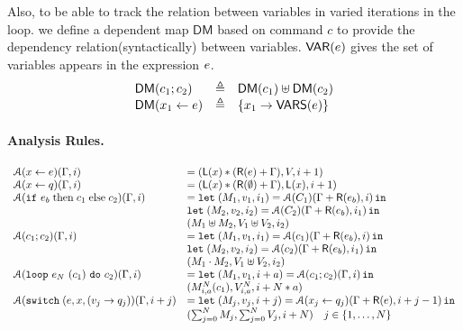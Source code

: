 \documentclass[a4paper,11pt]{article}
\begin{document}
Also, to be able to track the relation between variables in varied iterations in the loop. we define a dependent map $\mathsf{DM}$ based on command $c$ to provide the dependency relation(syntactically) between variables. $\mathsf{VAR}(e)$ gives the set of variables appears in the expression $e$.
\[
\begin{array}{lll}
\mathsf{DM} (c_1; c_2) & \triangleq &  \mathsf{DM} (c_1) \uplus \mathsf{DM} (c_2)  \\
\mathsf{DM} (x_1 \leftarrow e ) & \triangleq & \{  x_1 \to \mathsf{VARS}(e)  \}
\end{array}
\]


%
%
\paragraph{Analysis Rules.}
\[\begin{array}{ll}
    \mathcal{A}( \mathrel{ x \leftarrow e } )( \Gamma , i )  & =  ( \mathsf{L}(x) * ( \mathsf{R}(e) + \Gamma ), V, i+1 )\\
    \mathcal{A}( \mathrel{ x \leftarrow q })( \Gamma ,  i )  & = ( \mathsf{L}(x) * ( \mathsf{R}(\emptyset) + \Gamma) , \mathsf{L}(x) , i+1 )\\
    \mathcal{A}( \mathtt{if} ~ e_b \mbox{\;then\;} c_1 \mbox{\;else\;} c_2 )( \Gamma , i ) & =   \mathop{\mathtt{let}} \; (M_1, v_1, i_1) =  \mathcal{A}(C_1)(\Gamma +\mathsf{R}(e_b) , i)
    \mathop{ \mathtt{in}} \; \\
    &  \mathop{\mathtt{let}} \;  (M_2, v_2, i_2)= \mathcal{A}(C_2) (\Gamma +\mathsf{R}(e_b) ,i_1) \mathop{ \mathtt{in}} \; \\
    & (  M_1 \uplus M_2, V_1 \uplus V_2   , i_2 )
    \\
    \mathcal{A}( c_1 ; c_2 )( \Gamma ,  i )  & =  \mathop{\mathtt{let}} \;     (M_1, v_1, i_1) = 
    \mathcal{A}(c_1) (\Gamma  +\mathsf{R}(e_b) , i)
    \mathop{ \mathtt{in}} \; \\
    &  \mathop{\mathtt{let}} \;  (M_2, v_2, i_2) =                      \mathcal{A}(c_2)(\Gamma +\mathsf{R}(e_b) ,
      i_1) \mathop{ \mathtt{in}} \; \\ 
      & (  M_1 \cdot M_2, V_1 \uplus V_2   , i_2 )    \\
     \mathcal{A}( \mathtt{loop} ~ e_N ~ (c_1) ~ \mathtt{do} ~ c_2  )( \Gamma ,  i )  & =  \mathop{\mathtt{let}} \;     (M_1, v_1, i+a) = 
    \mathcal{A}(c_1;c_2 ) (\Gamma , i)
    \mathop{ \mathtt{in}} \; \\
    & ( M_{i,a}^N(c_1), V_{i, a}^N , i + N*a ) \\
 \mathcal{A}( \mathtt{switch}\;(e, x,(v_j \rightarrow q_j )  )( \Gamma ,  i+j )  & =  \mathop{\mathtt{let}} \;     (M_j, v_j, i+j) = 
    \mathcal{A}(x_j \leftarrow q_j ) (\Gamma + \mathsf{R}(e), i+j-1)     
   \mathop{ \mathtt{in}} \\
   & ( \sum_{j=0}^{N} M_j, \sum_{j=0}^{N} V_j, i + N ) \quad j \in \{1, \dots, N\}  \\
    \end{array}
\]
%
%
\end{document}
